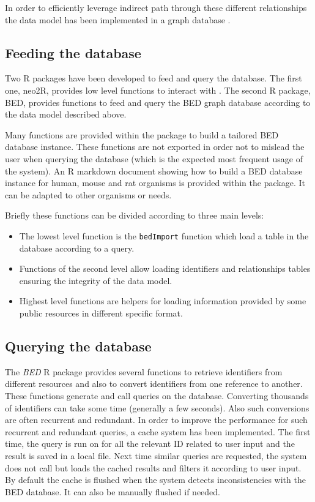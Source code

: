 \documentclass[9pt,a4paper,]{extarticle}
\theoremstyle{definition}
\theoremstyle{definition}
\theoremstyle{definition}
\theoremstyle{remark}
\begin{document}
In order to efficiently leverage indirect path through these different
relationships the data model has been implemented in
a \neo{} graph database \citep{neo4j_inc_neo4j_2017}.

\subsection{Feeding the database}\label{feeding-the-database}

Two R \citep{r_core_team_r:_2017} packages have been developed to feed and query
the database.
The first one, neo2R, provides low level functions to interact with
\neo{}. The second R package, BED,
provides functions to feed and query the BED
\neo{} graph database according to the
data model described above.

Many functions are provided within the package to build a tailored BED database
instance. These functions are not exported in order not to mislead
the user when querying the database (which is the expected most frequent
usage of the system). An R markdown document showing how to build a BED database
instance for human, mouse and rat organisms is provided within the
package. It can be adapted to other organisms or needs.

Briefly these functions can be divided according to three main levels:

\begin{itemize}
\item
  The lowest level function is the \texttt{bedImport} function
  which load a table in the \neo{} database according to a \cypher{} query.
\item
  Functions of the second level allow loading identifiers and relationships
  tables ensuring the integrity of the data model.
\item
  Highest level functions are helpers for loading information provided by
  some public resources in different specific format.
\end{itemize}

\subsection{Querying the database}\label{querying-the-database}

The \emph{BED} R package provides several functions to retrieve identifiers
from different resources and also to convert identifiers from one
reference to another.
These functions generate and call \cypher{} queries on the \neo{} database.
Converting thousands of identifiers can take some time
(generally a few seconds). Also such conversions are often recurrent and
redundant. In order to improve the performance for such recurrent and redundant
queries, a cache system has been implemented. The first time, the query is run
on \neo{} for all the relevant ID related to user input and the result is saved
in a local file. Next time similar queries are requested, the system does
not call \neo{} but loads the cached results and filters it according
to user input.
By default the cache is flushed when the system detects inconsistencies
with the BED database. It can also be manually flushed if needed.
\end{document}
